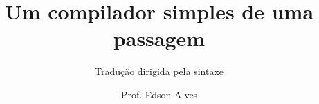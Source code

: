 \title{Um compilador simples de uma passagem}
\subtitle{Tradução dirigida pela sintaxe}
\date{}
\author{Prof. Edson Alves}
